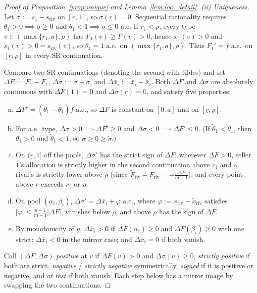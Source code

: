 \documentclass[12pt]{article}
\theoremstyle{mystyle}
\theoremstyle{mystyle2}
\newcommand{\1}{\mathbf{1}}
\begin{document}
\begin{proof}[Proof of Proposition~\ref{prop:unique} and Lemma~\ref{lem:loc_detail}]
\emph{(ii) Uniqueness.} Let $\sigma:=s_1-s_{\mathrm{riv}}$ on $[\underline r,1]$, so $\sigma(\underline r)=0$. Sequential rationality requires $\theta_1>0\implies\sigma\ge 0$ and $\theta_1<1\implies\sigma\le 0$ a.e. If $r_1<\rho$, every type $v\in(\max\{r_1,a\},\rho)$ has $F_1(v)\ge F(v)>0$, hence $x_1(v)>0$ and $s_1(v)>0=s_{\mathrm{riv}}(v)$, so $\theta_1=1$ a.e.\ on $(\max\{r_1,a\},\rho)$. Thus $F_1'=f$ a.e.\ on $[\underline r,\rho]$ in every SR continuation.

Compare two SR continuations (denoting the second with tildes) and set $\Delta F:=\tilde F_1-F_1$, $\Delta\sigma:=\tilde\sigma-\sigma$, and $\Delta\bar x_i:=\tilde{\bar x}_i-\bar x_i$. Both $\Delta F$ and $\Delta\sigma$ are absolutely continuous with $\Delta F(1)=0$ and $\Delta\sigma(\underline r)=0$, and satisfy five properties:
\begin{enumerate}[(a)]
\item $\Delta F'=(\tilde\theta_1-\theta_1)f$ a.e., so $\Delta F$ is constant on $[0,a]$ and on $[\underline r,\rho]$.
\item For a.e.\ type, $\Delta\sigma>0\implies\Delta F'\ge 0$ and $\Delta\sigma<0\implies\Delta F'\le 0$. (If $\tilde\theta_1<\theta_1$, then $\theta_1>0$ and $\tilde\theta_1<1$, so $\sigma\ge 0\ge\tilde\sigma$.)
\item On $(\underline r,1]$ off the pools, $\Delta\sigma'$ has the strict sign of $\Delta F$: wherever $\Delta F>0$, seller $1$'s allocation is strictly higher in the second continuation above $r_1$ and a rival's is strictly lower above $\rho$ (since $\tilde F_{\mathrm{riv}}-F_{\mathrm{riv}}=-\frac{\Delta F}{m-1}$), and every point above $\underline r$ exceeds $r_1$ or $\rho$.
\item On pool $(\alpha_i,\beta_i)$, $\Delta\sigma'=\Delta\bar x_i+\varphi$ a.e., where $\varphi:=x_{\mathrm{riv}}-\tilde x_{\mathrm{riv}}$ satisfies $|\varphi|\le\frac{n-1}{m-1}|\Delta F|$, vanishes below $\rho$, and above $\rho$ has the sign of $\Delta F$.
\item By monotonicity of $g$, $\Delta\bar x_i>0$ if $\Delta F(\alpha_i)\ge 0$ and $\Delta F(\beta_i)\ge 0$ with one strict; $\Delta\bar x_i<0$ in the mirror case; and $\Delta\bar x_i=0$ if both vanish.
\end{enumerate}

Call $(\Delta F,\Delta\sigma)$ \emph{positive} at $v$ if $\Delta F(v)>0$ and $\Delta\sigma(v)\ge 0$, \emph{strictly positive} if both are strict, \emph{negative} / \emph{strictly negative} symmetrically, \emph{signed} if it is positive or negative, and \emph{at rest} if both vanish. Each step below has a mirror image by swapping the two continuations.


\end{proof}
\end{document}
